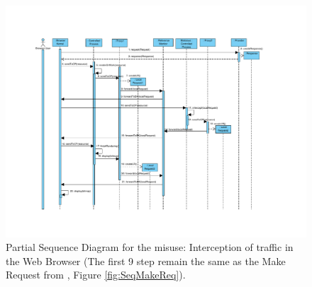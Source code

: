 \documentclass{sig-alternate-05-2015}
\begin{document}
\begin{figure}[h!t]
\vspace*{-2.5cm}
  \centering
  \hspace*{-2.5cm}\includegraphics[scale=0.85]{figures/misuse/MakeRequestMisuse_showOnlyMisuse.pdf}
  \vspace*{-2cm}
  \caption{Partial Sequence Diagram for the misuse: Interception of traffic in the Web Browser (The first 9 step remain the same as the Make Request from \cite{silva2015}, Figure \ref{fig:SeqMakeReq}).}
  \label{fig:SeqMisuse}
\end{figure}

\end{document}
